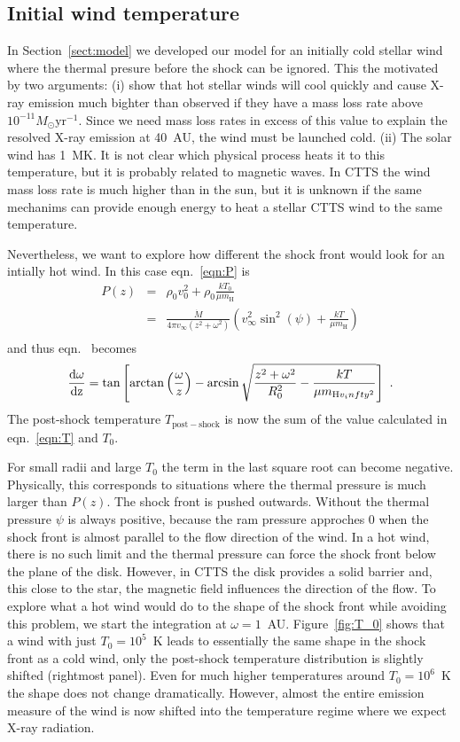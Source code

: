\subsection{Initial wind temperature}
\label{sect:T_0}
In Section~\ref{sect:model} we developed our model for an initially cold stellar wind where the thermal presure before the shock can be ignored. This the motivated by two arguments: (i) \citet{2007IAUS..243..299M} show that hot stellar winds will cool quickly and cause X-ray emission much bighter than observed if they have a mass loss rate above $10^{-11}M_\odot\mathrm{ yr}^{-1}$. Since we need mass loss rates in excess of this value to explain the resolved X-ray emission at 40~AU, the wind must be launched cold. (ii) The solar wind has 1~MK. It is not clear which physical process heats it to this temperature, but it is probably related to magnetic waves. In CTTS the wind mass loss rate is much higher than in the sun, but it is unknown if the same mechanims can provide enough energy to heat a stellar CTTS wind to the same temperature.

Nevertheless, we want to explore how different the shock front would look for an intially hot wind.
In this case eqn.~\ref{eqn:P} is
\begin{eqnarray}
P(z) & = & \rho_0 v_0^2 + \rho_0 \frac{k T_0}{\mu m_{\textrm{H}}} \nonumber\\ 
     & = & \frac{\dot{M}}{4\pi v_{\infty}(z^2+\omega^2)} \left( v_{\infty}^2 \sin^2(\psi) + \frac{kT}{\mu m_{\textrm{H}}}\right)\\
\end{eqnarray}
and thus eqn.~\label{eqn:ode} becomes
\begin{equation}
\frac{\rm{d}\omega}{\rm{d}z} = \tan\left[\arctan\left(\frac{\omega}{z}\right)-\arcsin\sqrt{\frac{z^2+\omega^2}{R_0^2}-\frac{kT}{\mu m_{\textrm{H} v_infty^2}}}\right]\ .
\end{equation}
The post-shock temperature $T_{\mathrm{post-shock}}$ is now the sum of the value calculated in eqn.~\ref{eqn:T} and $T_0$.

For small radii and large $T_0$ the term in the last square root can become negative. Physically, this corresponds to situations where the thermal pressure is much larger than $P(z)$. The shock front is pushed outwards. Without the thermal pressure $\psi$ is always positive, because the ram pressure approches 0 when the shock front is almost parallel to the flow direction of the wind. In a hot wind, there is no such limit and the thermal pressure can force the shock front below the plane of the disk. However, in CTTS the disk provides a solid barrier and, this close to the star, the magnetic field influences the direction of the flow. To explore what a hot wind would do to the shape of the shock front while avoiding this problem, we start the integration at $\omega=1$~AU. Figure~\ref{fig:T_0} shows that a wind with just $T_0=10^5$~K leads to essentially the same shape in the shock front as a cold wind, only the post-shock temperature distribution is slightly shifted (rightmost panel). Even for much higher temperatures around $T_0=10^6$~K the shape does not change dramatically. However, almost the entire emission measure of the wind is now shifted into the temperature regime where we expect X-ray radiation.
